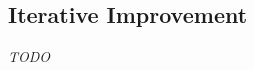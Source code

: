 



%

%









\subsection{Iterative Improvement}
\label{sec:iterative-improvement}

\emph{TODO}



